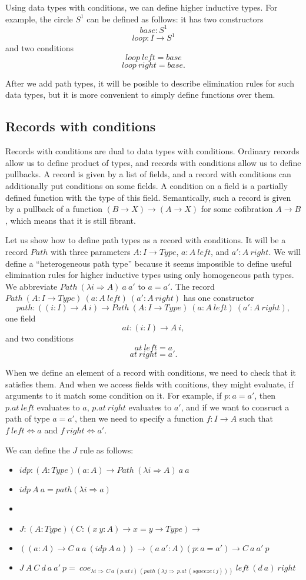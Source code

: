 \documentclass[8pt]{amsart}
\theoremstyle{definition}
\theoremstyle{remark}
\newcommand{\red}{\Rightarrow}
\newcommand{\deq}{\Leftrightarrow}
\numberwithin{figure}{section}
\begin{document}
Using data types with conditions, we can define higher inductive types.
For example, the circle $S^1$ can be defined as follows: it has two constructors
\[ base : S^1 \]
\[ loop : I \to S^1 \]
and two conditions
\[ loop\ left = base \]
\[ loop\ right = base. \]

After we add path types, it will be posible to describe elimination rules for such data types,
but it is more convenient to simply define functions over them.

\subsection{Records with conditions}

Records with conditions are dual to data types with conditions.
Ordinary records allow us to define product of types, and records with conditions allow us to define pullbacks.
A record is given by a list of fields, and a record with conditions can additionally put conditions on some fields.
A condition on a field is a partially defined function with the type of this field.
Semantically, such a record is given by a pullback of a function $(B \to X) \to (A \to X)$ for some cofibration $A \to B$, which means that it is still fibrant.

Let us show how to define path types as a record with conditions.
It will be a record $Path$ with three parameters $A : I \to Type$, $a : A\ left$, and $a' : A\ right$.
We will define a ``heterogeneous path type'' because it seems impossible to define useful elimination rules for higher inductive types using only homogeneous path types.
We abbreviate $Path\ (\lambda i \red A)\ a\ a'$ to $a = a'$.
The record $Path\ (A : I \to Type)\ (a : A\ left)\ (a' : A\ right)$ has one constructor
\[ path : ((i : I) \to A\ i) \to Path\ (A : I \to Type)\ (a : A\ left)\ (a' : A\ right), \]
one field
\[ at : (i : I) \to A\ i, \]
and two conditions
\[ at\ left = a \]
\[ at\ right = a'. \]

When we define an element of a record with conditions, we need to check that it satisfies them.
And when we access fields with conitions, they might evaluate, if arguments to it match some condition on it.
For example, if $p : a = a'$, then $p.at\ left$ evaluates to $a$, $p.at\ right$ evaluates to $a'$,
and if we want to consruct a path of type $a = a'$, then we need to specify a function $f : I \to A$ such that $f\ left \deq a$ and $f\ right \deq a'$.

We can define the $J$ rule as follows:
\begin{itemize}
\item[] $idp : (A : Type) (a : A) \to Path\ (\lambda i \red A)\ a\ a$
\item[] $idp\ A\ a = path (\lambda i \red a)$
\item[]
\item[] $J : (A : Type) (C : (x\ y : A) \to x = y \to Type) \to$
\item[] \qquad $((a : A) \to C\ a\ a\ (idp\ A\ a)) \to (a\ a' : A) (p : a = a') \to C\ a\ a'\ p$
\item[] $J\ A\ C\ d\ a\ a'\ p =\ coe_{\lambda i \red \,C\,a\,(p.at\,i)\,(path\,(\lambda j \red \,p.at\,(squeeze\,i\,j)))}\ left\ (d\ a)\ right$
\end{itemize}
\end{document}
